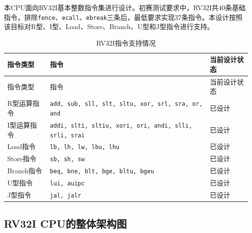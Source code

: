 \documentclass[UTF8,a4paper,12pt]{ctexart}
\newcommand{\code}[1]{\texttt{#1}}
\begin{document}
本CPU面向RV32I基本整数指令集进行设计。初赛测试要求中，RV32I共40条基础指令，排除\code{fence}、\code{ecall}、\code{ebreak}三条后，最低要求实现37条指令。本设计按照该目标对R型、I型、Load、Store、Branch、U型和J型指令进行支持。

\begin{longtable}{p{3cm}p{8cm}p{3cm}}
\caption{RV32I指令支持情况}\\
\toprule
指令类型 & 指令 & 当前设计状态 \\
\midrule
\endfirsthead
\toprule
指令类型 & 指令 & 当前设计状态 \\
\midrule
\endhead
R型运算指令 & \code{add, sub, sll, slt, sltu, xor, srl, sra, or, and} & 已设计 \\
I型运算指令 & \code{addi, slti, sltiu, xori, ori, andi, slli, srli, srai} & 已设计 \\
Load指令 & \code{lb, lh, lw, lbu, lhu} & 已设计 \\
Store指令 & \code{sb, sh, sw} & 已设计 \\
Branch指令 & \code{beq, bne, blt, bge, bltu, bgeu} & 已设计 \\
U型指令 & \code{lui, auipc} & 已设计 \\
J型指令 & \code{jal, jalr} & 已设计  \\
\bottomrule
\end{longtable}

\subsection{RV32I CPU的整体架构图}
\end{document}
